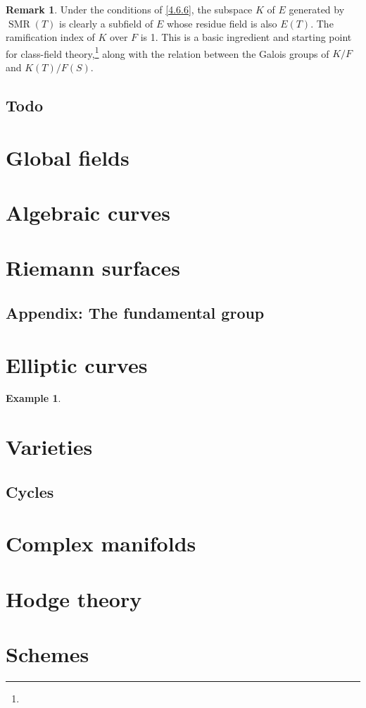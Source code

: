 \documentclass[10pt,leqno]{article}
\theoremstyle{definition}
\newtheorem{exam}[theo]{Example}
\newtheorem{rema}[theo]{Remark}
\def\fnfize{}
\begin{document}
\begin{rema}
\label{4.6.8}
Under the conditions of \ref{4.6.6}, the subspace $K$ of $E$ generated by $\operatorname{SMR}(T)$ is clearly a subfield of $E$ whose residue field is also $E(T)$.
The ramification index of $K$ over $F$ is 1.
This is a basic ingredient and starting point for class-field theory,\footnote{\fnfize} along with the relation between the Galois groups of $K/F$ and $K(T)/F(S)$.
\end{rema}



\subsection{Todo}
\label{ch:4.7}

\section{Global fields}
\label{ch:5}

\section{Algebraic curves}
\label{ch:6}

\section{Riemann surfaces}
\label{ch:7}

\subsection{Appendix: The fundamental group}
\label{ch:7.8}

\section{Elliptic curves}
\label{ch:8}

\begin{exam}
\label{8.3.2}
\end{exam}

\section{Varieties}
\label{ch:9}

\subsection{Cycles}
\label{ch:9.11}


\section{Complex manifolds}
\label{ch:10}

\section{Hodge theory}
\label{ch:11}

\section{Schemes}
\label{ch:12}







\end{document}
